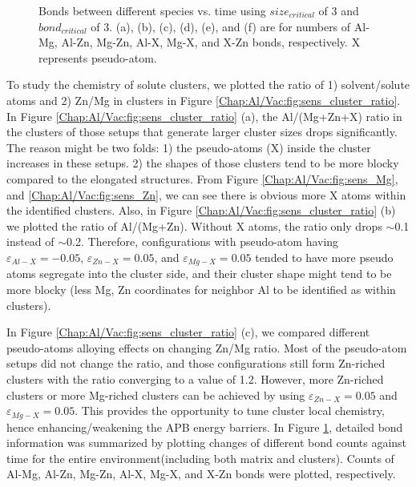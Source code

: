 \begin{figure}[!ht]
\caption[Bonds between different species vs. time using $size_{critical}$ of 3 and $bond_{critical}$ of 3.]{Bonds between different species vs. time using $size_{critical}$ of 3 and $bond_{critical}$ of 3. (a), (b), (c), (d), (e), and (f) are for numbers of Al-Mg, Al-Zn, Mg-Zn, Al-X, Mg-X, and X-Zn bonds, respectively. X represents pseudo-atom.}
\label{Chap:Al/Vac:fig:sens_bond}
\end{figure}
\endgroup


To study the chemistry of solute clusters, we plotted the ratio of 1) solvent/solute atoms and 2) Zn/Mg in clusters in Figure \ref{Chap:Al/Vac:fig:sens_cluster_ratio}. In Figure \ref{Chap:Al/Vac:fig:sens_cluster_ratio} (a), the Al/(Mg+Zn+X) ratio in the clusters of those setups that generate larger cluster sizes drops significantly. The reason might be two folds: 1) the pseudo-atoms (X) inside the cluster increases in these setups. 2) the shapes of those clusters tend to be more blocky compared to the elongated structures. From Figure \ref{Chap:Al/Vac:fig:sens_Mg}, and \ref{Chap:Al/Vac:fig:sens_Zn}, we can see there is obvious more X atoms within the identified clusters. Also, in Figure \ref{Chap:Al/Vac:fig:sens_cluster_ratio} (b) we plotted the ratio of Al/(Mg+Zn). Without X atoms, the ratio only drops $\sim$0.1 instead of $\sim$0.2. Therefore, configurations with pseudo-atom having  $\varepsilon_{Al-X} = -0.05$, $\varepsilon_{Zn-X} = 0.05$, and $\varepsilon_{Mg-X} = 0.05$ tended to have more pseudo atoms segregate into the cluster side, and their cluster shape might tend to be more blocky (less Mg, Zn coordinates for neighbor Al to be identified as within clusters).


In Figure \ref{Chap:Al/Vac:fig:sens_cluster_ratio} (c), we compared different pseudo-atoms alloying effects on changing Zn/Mg ratio. Most of the pseudo-atom setups did not change the ratio, and those configurations still form Zn-riched clusters with the ratio converging to a value of 1.2. However, more Zn-riched clusters or more Mg-riched clusters can be achieved by using $\varepsilon_{Zn-X} = 0.05$ and $\varepsilon_{Mg-X} = 0.05$. This provides the opportunity to tune cluster local chemistry, hence enhancing/weakening the APB energy barriers. In Figure \ref{Chap:Al/Vac:fig:sens_bond}, detailed bond information was summarized by plotting changes of different bond counts against time for the entire environment(including both matrix and clusters). Counts of Al-Mg, Al-Zn, Mg-Zn, Al-X, Mg-X, and X-Zn bonds were plotted, respectively.





